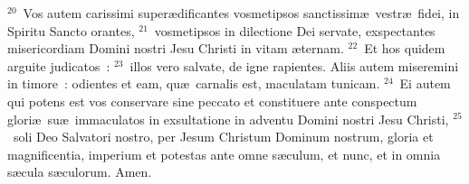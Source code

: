 ${}^{20}$~Vos autem carissimi super\ae dificantes vosmetipsos sanctissim\ae\ vestr\ae\ fidei, in Spiritu Sancto orantes,
${}^{21}$~vosmetipsos in dilectione Dei servate, exspectantes misericordiam Domini nostri Jesu Christi in vitam \ae ternam.
${}^{22}$~Et hos quidem arguite judicatos~:
${}^{23}$~illos vero salvate, de igne rapientes. Aliis autem miseremini in timore~: odientes et eam, qu\ae\ carnalis est, maculatam tunicam.
${}^{24}$~Ei autem qui potens est vos conservare sine peccato et constituere ante conspectum glori\ae\ su\ae\ immaculatos in exsultatione in adventu Domini nostri Jesu Christi,
${}^{25}$~soli Deo Salvatori nostro, per Jesum Christum Dominum nostrum, gloria et magnificentia, imperium et potestas ante omne s\ae culum, et nunc, et in omnia s\ae cula s\ae culorum. Amen.
